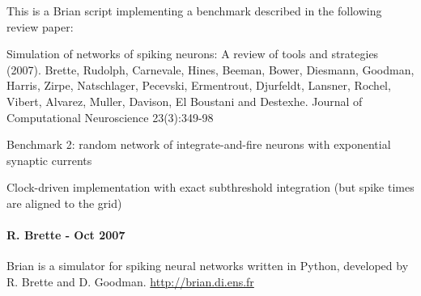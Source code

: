 \documentclass[letterpaper,10pt,english]{manual}
\begin{document}
This is a Brian script implementing a benchmark described
in the following review paper:

Simulation of networks of spiking neurons: A review of tools and strategies (2007).
Brette, Rudolph, Carnevale, Hines, Beeman, Bower, Diesmann, Goodman, Harris, Zirpe,
Natschlager, Pecevski, Ermentrout, Djurfeldt, Lansner, Rochel, Vibert, Alvarez, Muller,
Davison, El Boustani and Destexhe.
Journal of Computational Neuroscience 23(3):349-98

Benchmark 2: random network of integrate-and-fire neurons with exponential synaptic currents

Clock-driven implementation with exact subthreshold integration
(but spike times are aligned to the grid)


\paragraph{R. Brette - Oct 2007}

Brian is a simulator for spiking neural networks written in Python, developed by
R. Brette and D. Goodman.
\href{http://brian.di.ens.fr}{http://brian.di.ens.fr}
\end{document}
